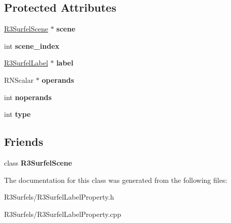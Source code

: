 \subsection*{Protected Attributes}
\begin{DoxyCompactItemize}
\item 
\hyperlink{class_r3_surfel_scene}{R3\+Surfel\+Scene} $\ast$ {\bfseries scene}\hypertarget{class_r3_surfel_label_property_a0d72a1711885091e63f52529ead36d8a}{}\label{class_r3_surfel_label_property_a0d72a1711885091e63f52529ead36d8a}

\item 
int {\bfseries scene\+\_\+index}\hypertarget{class_r3_surfel_label_property_adca517e6d5281f9dfbce896b2baf2adc}{}\label{class_r3_surfel_label_property_adca517e6d5281f9dfbce896b2baf2adc}

\item 
\hyperlink{class_r3_surfel_label}{R3\+Surfel\+Label} $\ast$ {\bfseries label}\hypertarget{class_r3_surfel_label_property_a06ea65e4c2dd847be2dbd307b5134c5c}{}\label{class_r3_surfel_label_property_a06ea65e4c2dd847be2dbd307b5134c5c}

\item 
R\+N\+Scalar $\ast$ {\bfseries operands}\hypertarget{class_r3_surfel_label_property_aa34b1affdf56b7061d8bcab2b40926f8}{}\label{class_r3_surfel_label_property_aa34b1affdf56b7061d8bcab2b40926f8}

\item 
int {\bfseries noperands}\hypertarget{class_r3_surfel_label_property_a0cc06793af4a19672b6b7dc3c08610d4}{}\label{class_r3_surfel_label_property_a0cc06793af4a19672b6b7dc3c08610d4}

\item 
int {\bfseries type}\hypertarget{class_r3_surfel_label_property_ab9c08661479fafee2cb063cd937670dc}{}\label{class_r3_surfel_label_property_ab9c08661479fafee2cb063cd937670dc}

\end{DoxyCompactItemize}
\subsection*{Friends}
\begin{DoxyCompactItemize}
\item 
class {\bfseries R3\+Surfel\+Scene}\hypertarget{class_r3_surfel_label_property_af9bb32c0eac7d1d54787bbc6b44586b6}{}\label{class_r3_surfel_label_property_af9bb32c0eac7d1d54787bbc6b44586b6}

\end{DoxyCompactItemize}


The documentation for this class was generated from the following files\+:\begin{DoxyCompactItemize}
\item 
R3\+Surfels/R3\+Surfel\+Label\+Property.\+h\item 
R3\+Surfels/R3\+Surfel\+Label\+Property.\+cpp\end{DoxyCompactItemize}

